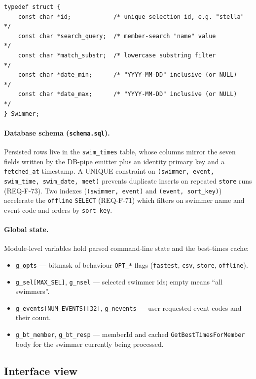 \documentclass[12pt]{article}
\newcommand{\code}[1]{\texttt{#1}}
\begin{document}
\begin{description}[style=nextline]
\begin{lstlisting}
typedef struct {
    const char *id;            /* unique selection id, e.g. "stella" */
    const char *search_query;  /* member-search "name" value         */
    const char *match_substr;  /* lowercase substring filter         */
    const char *date_min;      /* "YYYY-MM-DD" inclusive (or NULL)    */
    const char *date_max;      /* "YYYY-MM-DD" inclusive (or NULL)    */
} Swimmer;
\end{lstlisting}

\paragraph{Database schema (\texttt{schema.sql}).}
Persisted rows live in the \texttt{swim\_times} table, whose
columns mirror the seven fields written by the DB-pipe emitter
plus an identity primary key and a \texttt{fetched\_at}
timestamp.  A UNIQUE constraint on
\texttt{(swimmer, event, swim\_time, swim\_date, meet)} prevents
duplicate inserts on repeated \code{store} runs (REQ-F-73).
Two indexes (\texttt{(swimmer, event)} and
\texttt{(event, sort\_key)}) accelerate the \code{offline}
\texttt{SELECT} (REQ-F-71) which filters on swimmer name and
event code and orders by \texttt{sort\_key}.

\paragraph{Global state.}
Module-level variables hold parsed command-line state and the
best-times cache:

\begin{itemize}
  \item \code{g\_opts} --- bitmask of behaviour \code{OPT\_*} flags
        (\code{fastest}, \code{csv}, \code{store}, \code{offline}).
  \item \code{g\_sel[MAX\_SEL]}, \code{g\_nsel} --- selected swimmer
        ids; empty means ``all swimmers''.
  \item \code{g\_events[NUM\_EVENTS][32]}, \code{g\_nevents} ---
        user-requested event codes and their count.
  \item \code{g\_bt\_member}, \code{g\_bt\_resp} --- memberId and
        cached \code{GetBestTimesForMember} body for the swimmer
        currently being processed.
\end{itemize}

\subsection{Interface view}


\end{description}
\end{document}
